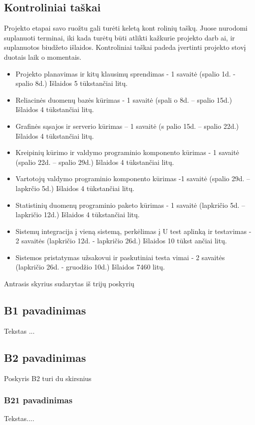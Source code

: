 \documentclass[a4paper,12pt]{article}
\begin{document}
\subsection{Kontroliniai taškai}
Projekto etapai savo ruožtu gali turėti keletą kont
rolinių taškų. Juose nurodomi suplanuoti terminai, 
iki kada turėtų būti atlikti kažkurie projekto darb
ai, ir suplanuotos biudžeto išlaidos. Kontroliniai 
taškai padeda įvertinti projekto stovį duotais laik
o momentais. 
\begin{itemize}
\item
Projekto planavimas ir kitų klausimų sprendimas - 1
 savaitė (spalio 1d. - spalio 8d.) Išlaidos 
5 tūkstančiai litų. 
\item
Reliacinės duomenų bazės kūrimas - 1 savaitė (spali
o 8d. – spalio 15d.) Išlaidos 4 
tūkstančiai litų. 
\item
Grafinės sąsajos ir serverio kūrimas – 1 savaitė (s
palio 15d. – spalio 22d.) Išlaidos 4 
tūkstančiai litų. 
\item
Kreipinių kūrimo ir valdymo programinio komponento 
kūrimas -  1 savaitė (spalio 22d. – 
spalio 29d.) Išlaidos 4 tūkstančiai litų. 
\item
Vartotojų valdymo programinio komponento kūrimas -1
 savaitė (spalio 29d. – lapkrčio 5d.) 
Išlaidos 4 tūkstančiai litų. 
\item
Statistinių duomenų programinio paketo kūrimas -  1
 savaitė (lapkričio 5d. – lapkričio 12d.) 
Išlaidos 4 tūkstančiai litų. 
\item
Sistemų integracija į vieną sistemą, perkėlimas į U
test aplinką ir testavimas - 2 savaitės 
(lapkričio 12d. - lapkričio 26d.) Išlaidos 10 tūkst
ančiai litų. 
	\item Sistemos pristatymas užsakovui ir paskutiniai testa
vimai - 2 savaitės (lapkričio 26d. - 
gruodžio 10d.) Išlaidos 7460 litų. 
\end{itemize}
 
 
 \vspace{2.5cm}
 
Antrasis skyrius sudarytas iš trijų poskyrių
\subsection{B1 pavadinimas}
 Tekstas ...
 \subsection{B2 pavadinimas}
 Poskyris B2 turi du skirsnius
 \subsubsection{B21 pavadinimas}
  Tekstas....
\end{document}
